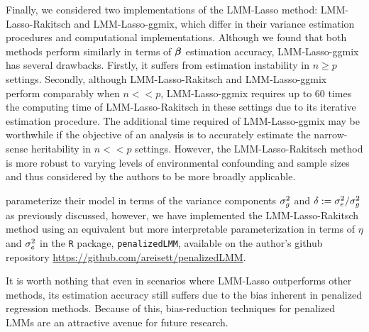 Finally, we considered two implementations of the LMM-Lasso method: LMM-Lasso-Rakitsch and LMM-Lasso-ggmix, which differ in their variance estimation procedures and computational implementations. Although we found that both methods perform similarly in terms of $\boldsymbol{\beta}{}$ estimation accuracy, LMM-Lasso-ggmix has several drawbacks. Firstly, it suffers from estimation instability in $n \ge p$ settings. Secondly, although LMM-Lasso-Rakitsch and LMM-Lasso-ggmix perform comparably when $n << p$, LMM-Lasso-ggmix requires up to 60 times the computing time of LMM-Lasso-Rakitsch in these settings due to its iterative estimation procedure. The additional time required of LMM-Lasso-ggmix may be worthwhile if the objective of an analysis is to accurately estimate the narrow-sense heritability in $n << p$ settings. However, the LMM-Lasso-Rakitsch method is more robust to varying levels of environmental confounding and sample sizes and thus considered by the authors to be more broadly applicable. 

\citet{Rakitsch2012} parameterize their model in terms of the variance components $\sigma^2_g$ and $\delta := \sigma^2_e / \sigma^2_g$ as previously discussed, however, we have implemented the LMM-Lasso-Rakitsch method using an equivalent but more interpretable parameterization in terms of $\eta$ and $\sigma^2_e$ in the \texttt{R} package, \texttt{penalizedLMM}, available on the author's github repository \url{https://github.com/areisett/penalizedLMM}.

It is worth nothing that even in scenarios where LMM-Lasso outperforms other methods, its estimation accuracy still suffers due to the bias inherent in penalized regression methods. Because of this, bias-reduction techniques for penalized LMMs are an attractive avenue for future research.



